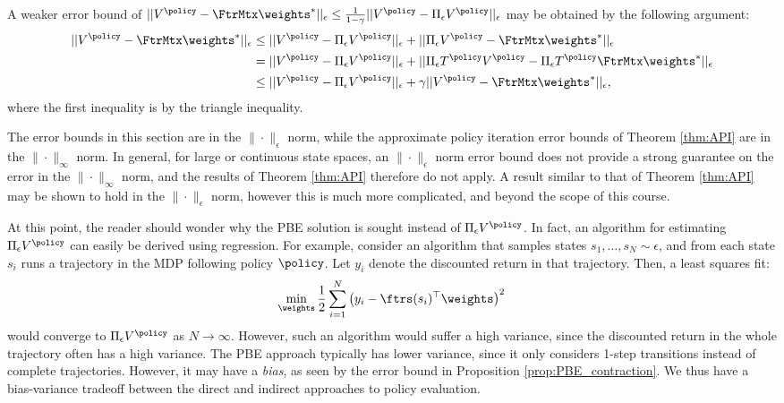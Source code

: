 \begin{remark}
A weaker error bound of $||V^\policy - \FtrMtx \weights^*||_\epsilon \le \frac{1}{1-\gamma}||V^\policy-\Pi_\epsilon
V^\policy||_\epsilon$ may be obtained by the following argument:
\begin{equation}
\begin{split}
  ||V^\policy - \FtrMtx \weights^*||_\epsilon  &\leq ||V^\policy
-\Pi_\epsilon V^\policy||_\epsilon + ||\Pi_\epsilon V^\policy -\FtrMtx \weights^*||_\epsilon  \\
    &= ||V^\policy -\Pi_\epsilon V^\policy||_\epsilon + ||\Pi_\epsilon T^\policy V^\policy -\Pi_\epsilon T^\policy\FtrMtx \weights^*||_\epsilon \\
&\leq ||V^\policy -\Pi_\epsilon V^\policy||_\epsilon + \gamma||V^\policy-\FtrMtx \weights^*||_\epsilon,
\end{split}
\end{equation}
where the first inequality is by the triangle inequality.
\end{remark}
\begin{remark}
The error bounds in this section are in the $\| \cdot \|_\epsilon$ norm, while the approximate policy iteration error bounds of Theorem \ref{thm:API} are in the $\| \cdot \|_\infty$ norm. In general, for large or continuous state spaces, an $\| \cdot \|_\epsilon$ norm error bound does not provide a strong guarantee on the error in the $\| \cdot \|_\infty$ norm, and the results of Theorem \ref{thm:API} therefore do not apply. A result similar to that of Theorem \ref{thm:API} may be shown to hold in the $\| \cdot \|_\epsilon$ norm, however this is much more complicated, and beyond the scope of this course.
\end{remark}
\begin{remark}
At this point, the reader should wonder why the PBE solution is sought instead of $\Pi_\epsilon V^\policy$. In fact, an algorithm for estimating $\Pi_\epsilon V^\policy$ can easily be derived using regression. For example, consider an algorithm that samples states $s_1,\dots,s_N \sim \epsilon$, and from each state $s_i$ runs a trajectory in the MDP following policy $\policy$. Let $y_i$ denote the discounted return in that trajectory. Then, a least squares fit:
\begin{equation*}
    \min_\weights \frac{1}{2}\sum_{i=1}^{N} \left(y_i - \ftrs(s_i)^\top\weights\right)^2
\end{equation*}
would converge to $\Pi_\epsilon V^\policy$ as $N\to \infty$. However, such an algorithm would suffer a high variance, since the discounted return in the whole trajectory often has a high variance. The PBE approach typically has lower variance, since it only considers 1-step transitions instead of complete trajectories. However, it may have a \emph{bias}, as seen by the error bound in Proposition \ref{prop:PBE_contraction}. We thus have a bias-variance tradeoff between the direct and indirect approaches to policy evaluation.
\end{remark}

